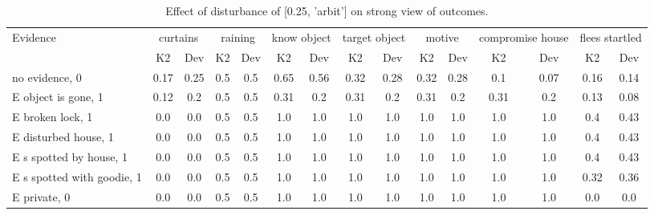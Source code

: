 \begin{table}\begin{tabular}{l|cc|cc|cc|cc|cc|cc|cc}\toprule\multirow{2}{*}{Evidence} & \multicolumn{2}{c}{curtains}& \multicolumn{2}{c}{raining}& \multicolumn{2}{c}{know object}& \multicolumn{2}{c}{target object}& \multicolumn{2}{c}{motive}& \multicolumn{2}{c}{compromise house}& \multicolumn{2}{c}{flees startled}\\& {K2} & {Dev}& {K2} & {Dev}& {K2} & {Dev}& {K2} & {Dev}& {K2} & {Dev}& {K2} & {Dev}& {K2} & {Dev}\\\midrule
no evidence, 0 & \cellcolor{Bittersweet}0.17&\cellcolor{Bittersweet}0.25&0.5&0.5&\cellcolor{Bittersweet}0.65&\cellcolor{Bittersweet}0.56&0.32&0.28&0.32&0.28&0.1&0.07&0.16&0.14\\E object is gone, 1 & \cellcolor{Bittersweet}0.12&\cellcolor{Bittersweet}0.2&0.5&0.5&\cellcolor{Bittersweet}0.31&\cellcolor{Bittersweet}0.2&\cellcolor{Bittersweet}0.31&\cellcolor{Bittersweet}0.2&\cellcolor{Bittersweet}0.31&\cellcolor{Bittersweet}0.2&\cellcolor{Bittersweet}0.31&\cellcolor{Bittersweet}0.2&\cellcolor{Bittersweet}0.13&\cellcolor{Bittersweet}0.08\\E broken lock, 1 & 0.0&0.0&0.5&0.5&1.0&1.0&1.0&1.0&1.0&1.0&1.0&1.0&0.4&0.43\\E disturbed house, 1 & 0.0&0.0&0.5&0.5&1.0&1.0&1.0&1.0&1.0&1.0&1.0&1.0&0.4&0.43\\E s spotted by house, 1 & 0.0&0.0&0.5&0.5&1.0&1.0&1.0&1.0&1.0&1.0&1.0&1.0&0.4&0.43\\E s spotted with goodie, 1 & 0.0&0.0&0.5&0.5&1.0&1.0&1.0&1.0&1.0&1.0&1.0&1.0&0.32&0.36\\E private, 0 & 0.0&0.0&0.5&0.5&1.0&1.0&1.0&1.0&1.0&1.0&1.0&1.0&0.0&0.0\\\bottomrule\end{tabular}\caption{Effect of disturbance of [0.25, 'arbit'] on strong view of outcomes.}\end{table}